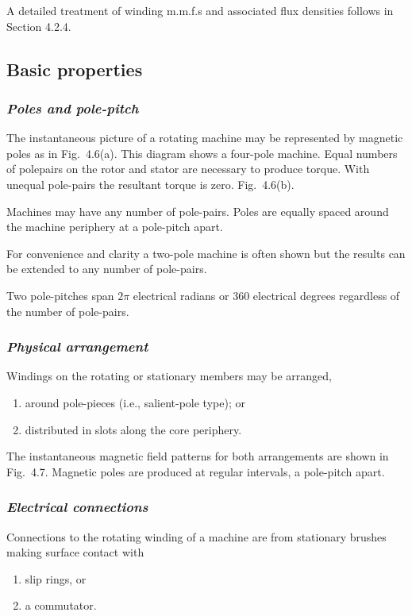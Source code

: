 \documentclass[a4paper,numbers=noenddot,12pt]{scrbook}
\begin{document}
A detailed treatment of winding m.m.f.s and associated flux densities follows in Section 4.2.4. 

\subsection{Basic properties}

\subsubsection{\textit{Poles and pole-pitch}}
The instantaneous picture of a rotating machine may be represented by magnetic poles as in Fig.\ 4.6(a). This diagram shows a four-pole machine. Equal numbers of pole­pairs on the rotor and stator are necessary to produce torque. With unequal pole-pairs the resultant torque is zero. Fig.\ 4.6(b).

Machines may have any number of pole-pairs. Poles are equally spaced around the machine periphery at a pole-pitch apart.

For convenience and clarity a two-pole machine is often shown but the results can be extended to any number of pole-pairs.

Two pole-pitches span $2\pi$ electrical radians or 360 electrical degrees regardless of the number of pole-pairs.

\subsubsection{\textit{Physical arrangement}}
Windings on the rotating or stationary members may be arranged,
\begin{enumerate}
    \item around pole-pieces (i.e., salient-pole type); or 
    \item distributed in slots along the core periphery. 
\end{enumerate}
The instantaneous magnetic field patterns for both arrangements are shown in Fig.\ 4.7. Magnetic poles are produced at regular intervals, a pole-pitch apart.

\subsubsection{\textit{Electrical connections}}
Connections to the rotating winding of a machine are from stationary brushes making surface contact with
\begin{enumerate}
    \item slip rings, or 
    \item a commutator.
\end{enumerate}
\end{document}
